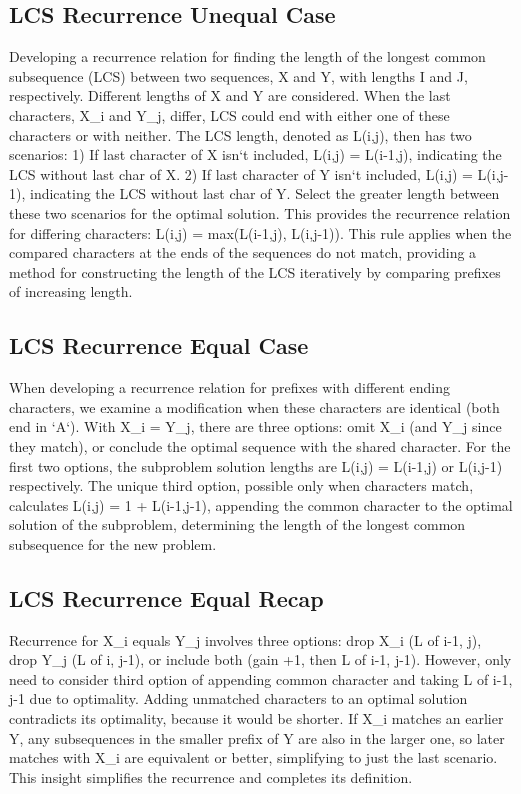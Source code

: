 \subsection*{LCS  Recurrence Unequal Case}
Developing a recurrence relation for finding the length of the longest common subsequence (LCS) between two sequences, X and Y, with lengths I and J, respectively.
Different lengths of X and Y are considered.
When the last characters, X\_i and Y\_j, differ, LCS could end with either one of these characters or with neither.
The LCS length, denoted as L(i,j), then has two scenarios: 1) If last character of X isn`t included, L(i,j) = L(i-1,j), indicating the LCS without last char of X\@.
2) If last character of Y isn`t included, L(i,j) = L(i,j-1), indicating the LCS without last char of Y\@.
Select the greater length between these two scenarios for the optimal solution.
This provides the recurrence relation for differing characters: L(i,j) = max(L(i-1,j), L(i,j-1)).
This rule applies when the compared characters at the ends of the sequences do not match, providing a method for constructing the length of the LCS iteratively by comparing prefixes of increasing length.

\subsection*{LCS  Recurrence Equal Case}
When developing a recurrence relation for prefixes with different ending characters, we examine a modification when these characters are identical (both end in `A`).
With X\_i = Y\_j, there are three options: omit X\_i (and Y\_j since they match), or conclude the optimal sequence with the shared character.
For the first two options, the subproblem solution lengths are L(i,j) = L(i-1,j) or L(i,j-1) respectively.
The unique third option, possible only when characters match, calculates L(i,j) = 1 + L(i-1,j-1), appending the common character to the optimal solution of the subproblem, determining the length of the longest common subsequence for the new problem.

\subsection*{LCS  Recurrence Equal Recap}
Recurrence for X\_i equals Y\_j involves three options: drop X\_i (L of i-1, j), drop Y\_j (L of i, j-1), or include both (gain +1, then L of i-1, j-1).
However, only need to consider third option of appending common character and taking L of i-1, j-1 due to optimality.
Adding unmatched characters to an optimal solution contradicts its optimality, because it would be shorter.
If X\_i matches an earlier Y, any subsequences in the smaller prefix of Y are also in the larger one, so later matches with X\_i are equivalent or better, simplifying to just the last scenario.
This insight simplifies the recurrence and completes its definition.

